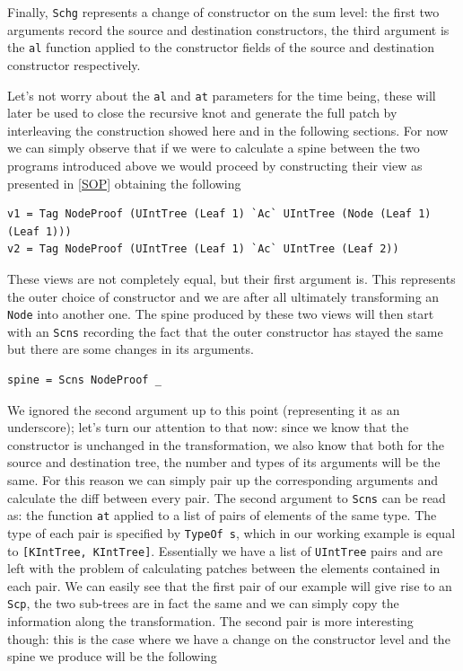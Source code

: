 \documentclass[11pt, titlepage]{article}
\newcommand{\toHaskell}[1]{\texttt{#1}\xspace}
\begin{document}
Finally, \texttt{Schg} represents a change of constructor on the sum level: the first two arguments record the
source and destination constructors, the third argument is the
\texttt{al} function applied to the constructor fields of the source and
destination constructor respectively.

Let's not worry about the \texttt{al} and \texttt{at} parameters for the time 
being, these will later be used to close the recursive knot and generate the full patch by interleaving
the construction showed here and in the following sections. 
For now we can simply observe that if we were to calculate a spine between the 
two programs introduced above we would proceed by constructing their view as 
presented in \ref{SOP} obtaining the following

\begin{verbatim}
v1 = Tag NodeProof (UIntTree (Leaf 1) `Ac` UIntTree (Node (Leaf 1) (Leaf 1)))
v2 = Tag NodeProof (UIntTree (Leaf 1) `Ac` UIntTree (Leaf 2))
\end{verbatim}

These views are not completely equal, but their first argument is. This represents the outer choice 
of constructor and we are after all ultimately transforming an \texttt{Node} into another one. The spine produced
by these two views will then start with an \texttt{Scns} recording the fact that 
the outer constructor has stayed the same but there are some changes in its 
arguments.

\begin{verbatim}
spine = Scns NodeProof _
\end{verbatim}

We ignored the second argument up to this point (representing it as an underscore); let's turn our attention to 
that now: since we know that the constructor is unchanged in the transformation, we also know that 
both for the source and destination tree, the number and types of its arguments 
will be the same. For this reason we can simply pair up the corresponding 
arguments and calculate the diff between every pair. The second argument to \texttt{Scns} can be read as: the function 
\texttt{at} applied to a list of pairs of elements of the same type. The type of each 
pair is specified by \texttt{TypeOf s}, which in our working example is equal to 
\toHaskell{[KIntTree, KIntTree]}. Essentially we have a list of \texttt{UIntTree} pairs and are left with the problem of calculating patches between the elements contained in 
each pair. 
We can easily see that the first pair of our example will give rise to an \texttt{Scp}, the two sub-trees are in fact the same and we can simply copy the information along the transformation. 
The second pair is more interesting though: this is the case where we have a change on the constructor level and the spine we produce will be the following
\end{document}
